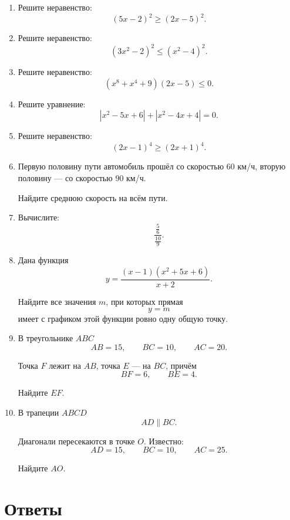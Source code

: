 \documentclass[a4paper,12pt]{article}
\begin{document}
\begin{enumerate}

\item
Решите неравенство:
\[
(5x-2)^2\ge(2x-5)^2.
\]

\item
Решите неравенство:
\[
(3x^2-2)^2\le(x^2-4)^2.
\]

\item
Решите неравенство:
\[
(x^8+x^4+9)(2x-5)\le0.
\]

\item
Решите уравнение:
\[
|x^2-5x+6|+|x^2-4x+4|=0.
\]

\item
Решите неравенство:
\[
(2x-1)^4\ge(2x+1)^4.
\]

\item
Первую половину пути автомобиль прошёл
со скоростью \(60\) км/ч,
вторую половину --- со скоростью \(90\) км/ч.

Найдите среднюю скорость на всём пути.

\item
Вычислите:
\[
\frac{\frac56}{\frac{10}{9}}.
\]

\item
Дана функция
\[
y=
\frac{(x-1)(x^2+5x+6)}{x+2}.
\]

Найдите все значения \(m\), при которых прямая
\[
y=m
\]
имеет с графиком этой функции ровно одну общую точку.

\item
В треугольнике \(ABC\)
\[
AB=15,\qquad
BC=10,\qquad
AC=20.
\]

Точка \(F\) лежит на \(AB\),
точка \(E\) --- на \(BC\), причём
\[
BF=6,\qquad
BE=4.
\]

Найдите \(EF\).

\item
В трапеции \(ABCD\)
\[
AD\parallel BC.
\]

Диагонали пересекаются в точке \(O\).
Известно:
\[
AD=15,\qquad
BC=10,\qquad
AC=25.
\]

Найдите \(AO\).

\end{enumerate}


\clearpage

\section*{\color{darkaccent}Ответы}
\end{document}
